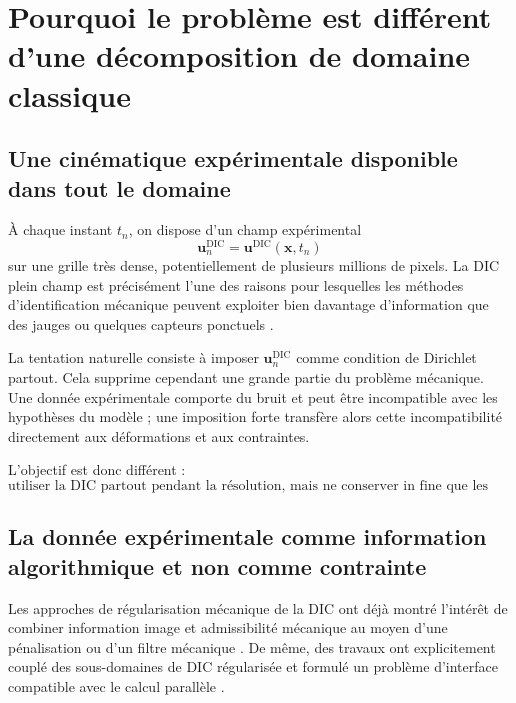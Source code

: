 \documentclass[11pt,a4paper]{article}
\newcommand{\udic}{\bm{u}^{\mathrm{DIC}}}
\begin{document}
\section{Pourquoi le problème est différent d'une décomposition de domaine classique}

\subsection{Une cinématique expérimentale disponible dans tout le domaine}

À chaque instant $t_n$, on dispose d'un champ expérimental
\begin{equation}
  \udic_n = \udic(\bm{x},t_n)
\end{equation}
sur une grille très dense, potentiellement de plusieurs millions de pixels. La DIC plein champ est
précisément l'une des raisons pour lesquelles les méthodes d'identification mécanique peuvent
exploiter bien davantage d'information que des jauges ou quelques capteurs ponctuels
\parencite{hild2006review}.

La tentation naturelle consiste à imposer $\udic_n$ comme condition de Dirichlet partout. Cela
supprime cependant une grande partie du problème mécanique. Une donnée expérimentale comporte
du bruit et peut être incompatible avec les hypothèses du modèle ; une imposition forte transfère
alors cette incompatibilité directement aux déformations et aux contraintes.

L'objectif est donc différent :
\begin{equation}
  \boxed{
  \text{utiliser la DIC partout pendant la résolution, mais ne conserver in fine
  que les vrais bords de Dirichlet.}
  }
\end{equation}

\subsection{La donnée expérimentale comme information algorithmique et non comme contrainte}

Les approches de régularisation mécanique de la DIC ont déjà montré l'intérêt de combiner
information image et admissibilité mécanique au moyen d'une pénalisation ou d'un filtre mécanique
\parencite{rethore2009mechanicalfilter,mendoza2019regularization}. De même, des travaux ont
explicitement couplé des sous-domaines de DIC régularisée et formulé un problème d'interface
compatible avec le calcul parallèle \parencite{bouclier2017domain}.
\end{document}
